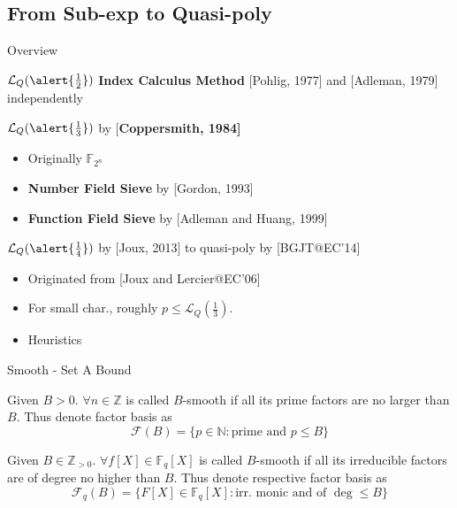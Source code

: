\documentclass{beamer}
\begin{document}
	\subsection{From Sub-exp to Quasi-poly}		
		\begin{frame}{Overview}
			\begin{block}{$\mathcal{L}_Q(\alert{\frac{1}{2}})$ \textbf{Index Calculus Method}}
				[Pohlig, 1977] and [Adleman, 1979] independently
			\end{block}
			\pause
			\begin{block}{$\mathcal{L}_Q(\alert{\frac{1}{3}})$ by [\textbf{Coppersmith, 1984]}}
				\begin{itemize}
						\item
							Originally $\mathbb{F}_{2^n}$
						\item
							\textbf{Number Field Sieve} by [Gordon, 1993]
						\item
							\textbf{Function Field Sieve} by [Adleman and Huang, 1999]
				\end{itemize}
			\end{block}
			\pause
			\begin{block}{$\mathcal{L}_Q(\alert{\frac{1}{4}})$ by [Joux, 2013] to \alert{quasi-poly} by [BGJT@EC'14]}
				\begin{itemize}
					\item 
						Originated from [Joux and Lercier@EC'06]
					\item
						For small char., roughly $p \leq \mathcal{L}_Q(\frac{1}{3})$.
					\item
						Heuristics
				\end{itemize}
			\end{block}
		\end{frame}
		\begin{frame}{Smooth - Set A Bound}
			\begin{definition}
				Given $B>0$. 
				$\forall n\in\mathbb{Z}$ is called \alert{$B$-smooth} if all its prime factors are no larger than $B$. 
				Thus denote \alert{factor basis} as
				$$\mathcal{F}(B) = \{ p\in\mathbb{N}: \text{prime and } p\leq B\}$$
			\end{definition}
			\pause
			\begin{definition}
				Given $B\in\mathbb{Z}_{>0}$.
				$\forall f[X]\in\mathbb{F}_q[X]$ is called \alert{$B$-smooth} if all its irreducible factors are of degree no higher than $B$.
				Thus denote respective \alert{factor basis} as
				$$\mathcal{F}_q(B) = \{F[X]\in\mathbb{F}_q[X]: \text{irr. monic and of }\deg\leq B\}$$
			\end{definition}
		\end{frame}
\end{document}

